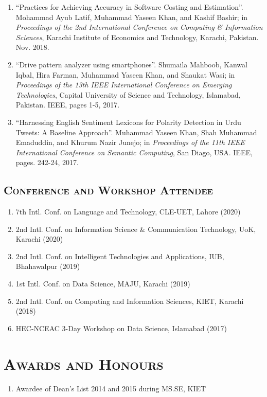 \documentclass[a4paper, 10pt]{article}
\begin{document}
\begin{enumerate}
  \item ``Practices for Achieving Accuracy in Software Costing and Estimation''. Mohammad Ayub Latif, \textcolor{NavyBlue}{Muhammad Yaseen Khan}, and Kashif Bashir; in \emph{Proceedings of the 2nd International Conference on Computing \& Information Sciences}, Karachi Institute of Economics and Technology, Karachi, Pakistan. Nov. 2018.
  
  \item ``Drive pattern analyzer using smartphones''. Shumaila Mahboob, Kanwal Iqbal, Hira Farman, \textcolor{NavyBlue}{Muhammad Yaseen Khan}, and Shaukat Wasi; in \emph{ Proceedings of the 13th IEEE International Conference on Emerging Technologies}, Capital University of Science and Technology, Islamabad, Pakistan. IEEE, pages 1-5, 2017.
  
  \item ``Harnessing English Sentiment Lexicons for Polarity Detection in Urdu Tweets: A Baseline Approach''. \textcolor{NavyBlue}{Muhammad Yaseen Khan}, Shah Muhammad Emaduddin, and Khurum Nazir Junejo;  in \emph{Proceedings of the 11th IEEE International Conference on Semantic Computing}, San Diago, USA. IEEE, pages. 242-24, 2017.
\end{enumerate}

\subsection*{\normalfont\textsc{Conference and Workshop Attendee}}
\begin{enumerate}
\itemsep-4pt
\item 7th Intl. Conf. on Language and Technology, CLE-UET, Lahore (2020)
\item 2nd Intl. Conf. on Information Science \& Communication Technology, UoK, Karachi (2020)
\item 2nd Intl. Conf. on Intelligent Technologies and Applications, IUB, Bhahawalpur (2019)
\item 1st Intl. Conf. on Data Science, MAJU, Karachi (2019)
\item 2nd Intl. Conf. on Computing and Information Sciences, KIET, Karachi (2018)
\item HEC-NCEAC 3-Day Workshop on Data Science, Islamabad (2017) 
\end{enumerate}

\section*{\normalfont\textsc{Awards and Honours}}
\begin{enumerate}
\itemsep-4pt 
 \item Awardee of Dean's List 2014 and 2015 during MS.SE, KIET
\end{enumerate}
\end{document}
